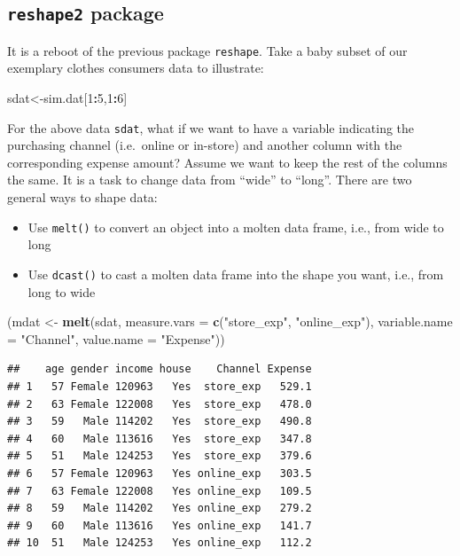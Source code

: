 \documentclass[12pt,]{krantz}
\makeatletter
\newenvironment{Shaded}{\begin{snugshade}}{\end{snugshade}}
\newcommand{\DataTypeTok}[1]{\textcolor[rgb]{0.27,0.27,0.27}{#1}}
\newcommand{\DecValTok}[1]{\textcolor[rgb]{0.06,0.06,0.06}{#1}}
\newcommand{\KeywordTok}[1]{\textcolor[rgb]{0.27,0.27,0.27}{\textbf{#1}}}
\newcommand{\NormalTok}[1]{#1}
\newcommand{\OperatorTok}[1]{\textcolor[rgb]{0.43,0.43,0.43}{\textbf{#1}}}
\newcommand{\StringTok}[1]{\textcolor[rgb]{0.5,0.5,0.5}{#1}}
\providecommand{\tightlist}{%
  \setlength{\itemsep}{0pt}\setlength{\parskip}{0pt}}
\newenvironment{kframe}{%
\medskip{}
\setlength{\fboxsep}{.8em}
 \def\at@end@of@kframe{}%
 \ifinner\ifhmode%
  \def\at@end@of@kframe{\end{minipage}}%
  \begin{minipage}{\columnwidth}%
 \fi\fi%
 \def\FrameCommand##1{\hskip\@totalleftmargin \hskip-\fboxsep
 \colorbox{shadecolor}{##1}\hskip-\fboxsep
     \hskip-\linewidth \hskip-\@totalleftmargin \hskip\columnwidth}%
 \MakeFramed {\advance\hsize-\width
   \@totalleftmargin\z@ \linewidth\hsize
   \@setminipage}}%
 {\par\unskip\endMakeFramed%
 \at@end@of@kframe}
\renewenvironment{Shaded}{\begin{kframe}}{\end{kframe}}
\makeatother
\begin{document}
\hypertarget{reshape2-package}{%
\subsection{\texorpdfstring{\texttt{reshape2} package}{reshape2 package}}\label{reshape2-package}}

It is a reboot of the previous package \texttt{reshape}. Take a baby subset of our exemplary clothes consumers data to illustrate:

\begin{Shaded}
\begin{Highlighting}[]
\NormalTok{sdat<-sim.dat[}\DecValTok{1}\OperatorTok{:}\DecValTok{5}\NormalTok{,}\DecValTok{1}\OperatorTok{:}\DecValTok{6}\NormalTok{]}
\end{Highlighting}
\end{Shaded}

For the above data \texttt{sdat}, what if we want to have a variable indicating the purchasing channel (i.e.~online or in-store) and another column with the corresponding expense amount? Assume we want to keep the rest of the columns the same. It is a task to change data from ``wide'' to ``long''. There are two general ways to shape data:

\begin{itemize}
\tightlist
\item
  Use \texttt{melt()} to convert an object into a molten data frame, i.e., from wide to long
\item
  Use \texttt{dcast()} to cast a molten data frame into the shape you want, i.e., from long to wide
\end{itemize}

\begin{Shaded}
\begin{Highlighting}[]
\NormalTok{(mdat <-}\StringTok{ }\KeywordTok{melt}\NormalTok{(sdat, }\DataTypeTok{measure.vars =} \KeywordTok{c}\NormalTok{(}\StringTok{"store_exp"}\NormalTok{, }\StringTok{"online_exp"}\NormalTok{),}
              \DataTypeTok{variable.name =} \StringTok{"Channel"}\NormalTok{, }
              \DataTypeTok{value.name =} \StringTok{"Expense"}\NormalTok{))}
\end{Highlighting}
\end{Shaded}

\begin{verbatim}
##    age gender income house    Channel Expense
## 1   57 Female 120963   Yes  store_exp   529.1
## 2   63 Female 122008   Yes  store_exp   478.0
## 3   59   Male 114202   Yes  store_exp   490.8
## 4   60   Male 113616   Yes  store_exp   347.8
## 5   51   Male 124253   Yes  store_exp   379.6
## 6   57 Female 120963   Yes online_exp   303.5
## 7   63 Female 122008   Yes online_exp   109.5
## 8   59   Male 114202   Yes online_exp   279.2
## 9   60   Male 113616   Yes online_exp   141.7
## 10  51   Male 124253   Yes online_exp   112.2
\end{verbatim}
\end{document}
